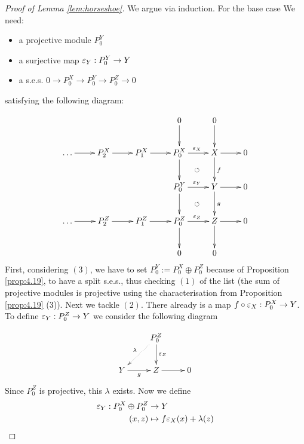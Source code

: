\documentclass[twoside = false,	%
		headsepline,		%
		parskip = true,
		]{scrbook}						%
\begin{document}
    \begin{proof}[Proof of Lemma \ref{lem:horseshoe}]
        We argue via induction. For the base case  We need:
        \begin{itemize}
            \item a projective module $P_0^Y$
            \item a surjective map $\varepsilon_Y: P_0^Y \to Y$
            \item a s.e.s. $0 \to P_0^X \to P_0^Y \to P_0^Z \to 0$
        \end{itemize}
        satisfying the following diagram:

        \begin{equation*}
        \xymatrix {
            & & & 0 \ar[d] & 0 \ar[d] & \\
            \dots \ar[r] & P_2^X \ar[r] & P_1^X \ar[r] & P_0^X \ar[d] \ar[r]^{\e_X} & X \ar[d]^f \ar[r] & 0 \\
            & & & P_0^Y \ar[d] \ar[r]^{\e_Y} \ar@{}[ur]|{\circlearrowleft} & Y \ar[d]^g \ar[r] & 0 \\
            \dots \ar[r] & P_2^Z \ar[r] & P_1^Z \ar[r] & P_0^Z \ar[d] \ar[r]^{\e_Z}\ar@{}[ur]|{\circlearrowleft} & Z \ar[d] \ar[r] & 0 \\
            & & & 0 & 0
        }
        \end{equation*}
       First, considering $(3)$, we have to set $P_0^Y:=P_0^X \oplus P_0^Z$ because of Proposition \ref{prop:4.19}, to have a split s.e.s., thus checking $(1)$ of the list (the sum of projective modules is projective using the characterisation from Proposition \ref{prop:4.19} (3)).
       Next we tackle $(2)$. There already is a map $f \circ \varepsilon_X: P_0^X \to Y$. To define $\varepsilon_Y: P_0^Z \to Y$ we consider the following diagram

       \begin{equation*}
        \xymatrix {
            & P_0^Z \ar@{.>}[dl]_{\lambda} \ar[d]^{\e_Z} \\
            Y \ar[r]_{g}& Z \ar[r]& 0
        }
       \end{equation*}
       Since $P_0^Z$ is projective, this $\lambda$ exists. Now we define
       \begin{equation*}
        \begin{split}
            \varepsilon_Y: P_0^X \oplus P_0^Z &\to Y \\
            (x,z) &\mapsto f \varepsilon_X(x) + \lambda(z)
        \end{split}
       \end{equation*}


\end{proof}
\end{document}
